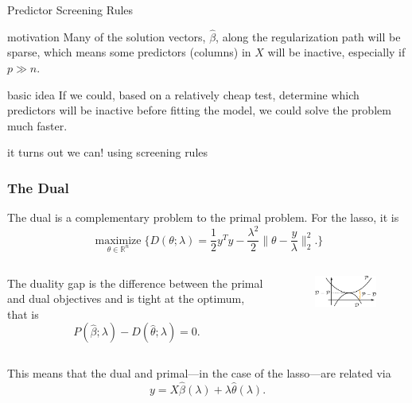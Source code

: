 \documentclass[10pt,ignorenonframetext]{beamer}
\begin{document}
\begin{frame}{Predictor Screening Rules}
  \begin{block}{motivation}
    Many of the solution vectors, \(\hat\beta\),
    along the regularization path will be \alert{sparse}, which means some
    predictors (columns) in \(X\) will be \alert{inactive}, especially
    if \(p \gg n\).
  \end{block}
  \pause
  \begin{block}{basic idea}
    If we could, based on a relatively \alert{cheap} test, determine which
    predictors will be inactive before fitting the model, we could solve
    the problem \alert{much faster}. 	
  \end{block}
  \pause
  \begin{block}{it turns out we can!}
    using screening rules
  \end{block}
\end{frame}

\begin{frame}[c]
  \frametitle{The Dual}
  The \alert{dual} is a complementary problem to the primal problem.
  For the lasso, it is
  \[
    \operatorname*{maximize}_{\theta \in \mathbb{R}^n}
    \Big\{
    D(\theta; \lambda) = \frac 1 2 y^T y -
    \frac{\lambda^2}{2} \Big\lVert \theta - \frac y \lambda \Big\rVert_2^2.
    \Big\}
  \]
  \begin{columns}
    \begin{column}[t]{0.45\linewidth}
      The \alert{duality gap} is the difference between the primal and dual
      objectives and is tight at the optimum, that is
      \[
        P(\hat\beta; \lambda) - D(\hat\theta; \lambda) = 0.
      \]
    \end{column}
    \begin{column}[t]{0.45\linewidth}
      \begin{figure}[htpb]
        \centering
        \includegraphics[]{images/duality-gap.pdf}
        \label{fig:images/duality-gap}
      \end{figure}
    \end{column}
  \end{columns}
  \medskip
  \medskip

  This means that the dual and primal---in the case of the lasso---are related
  via
  \[
    y = X\hat\beta(\lambda) + \lambda \hat \theta(\lambda).
  \]
\end{frame}
\end{document}
